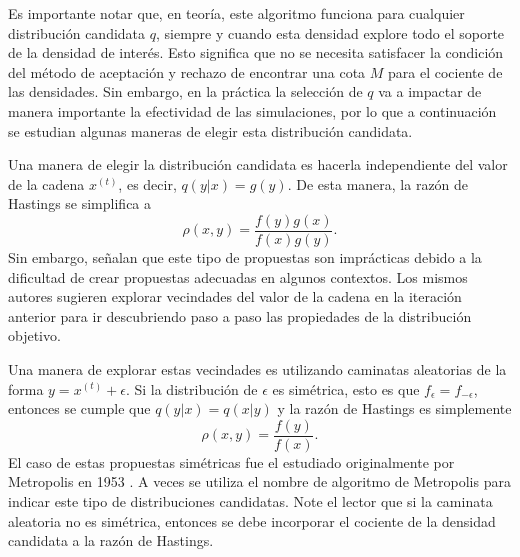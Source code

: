 \documentclass[11pt,a4paper]{article}
\begin{document}
Es importante notar que, en teoría, este algoritmo funciona para cualquier distribución candidata $q$, siempre y cuando esta densidad explore todo el soporte de la densidad de interés. Esto significa que no se necesita satisfacer la condición del método de aceptación y rechazo de encontrar una cota $M$ para el cociente de las densidades. Sin embargo, en la práctica la selección de $q$ va a impactar de manera importante la efectividad de las simulaciones, por lo que a continuación se estudian algunas maneras de elegir esta distribución candidata.

Una manera de elegir la distribución candidata es hacerla independiente del valor de la cadena $x^{(t)}$, es decir, $q(y|x) = g(y)$. De esta manera, la razón de Hastings se simplifica a $$\rho (x, y) = \frac{f(y)g(x)}{f(x)g(y)}.$$ Sin embargo, \citet{casella} señalan que este tipo de propuestas son imprácticas debido a la dificultad de crear propuestas adecuadas en algunos contextos. Los mismos autores sugieren explorar vecindades del valor de la cadena en la iteración anterior para ir descubriendo paso a paso las propiedades de la distribución objetivo.

Una manera de explorar estas vecindades es utilizando caminatas aleatorias de la forma $y = x^{(t)} + \epsilon$. Si la distribución de $\epsilon$ es simétrica, esto es que $f_{\epsilon} = f_{-\epsilon}$, entonces se cumple que $q(y|x) = q(x|y)$ y la razón de Hastings es simplemente $$\rho (x, y) = \frac{f(y)}{f(x)}.$$ El caso de estas propuestas simétricas fue el estudiado originalmente por Metropolis en 1953 \citep{gelman}. A veces se utiliza el nombre de algoritmo de Metropolis para indicar este tipo de distribuciones candidatas. Note el lector que si la caminata aleatoria no es simétrica, entonces se debe incorporar el cociente de la densidad candidata a la razón de Hastings.
\end{document}
